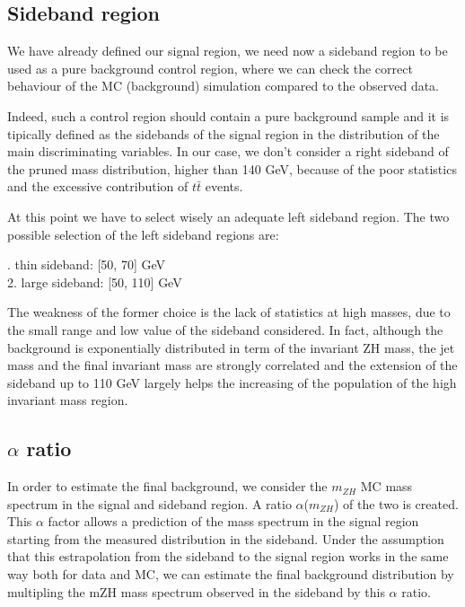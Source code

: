 \documentclass[12pt]{article} %
\begin{document}
\subsection{Sideband region} %

We have already defined our signal region, we need now a sideband region to be used as a pure background control region, where we can check the correct behaviour of the MC (background) simulation compared to the observed data. 

Indeed, such a control region should contain a pure background sample and it is tipically defined as the sidebands of the signal region in the distribution of the main discriminating variables. In our case, we don't consider a right sideband of the pruned mass distribution, higher than 140 GeV, because of the poor statistics and the excessive contribution of $t\bar{t}$ events.

At this point we have to select wisely an adequate left sideband region. The two possible selection of the left sideband regions are:

. thin sideband: [50, 70] GeV \\
2. large sideband: [50, 110] GeV 

The weakness of the former choice is the lack of statistics at high masses, due to the small range and low value of the sideband considered. In fact, although the background is exponentially distributed in term of the invariant ZH mass, the jet mass and the final invariant mass are strongly correlated and the extension of the sideband up to 110 GeV largely helps the increasing of the population of the high invariant mass region.


\subsection{$\alpha$ ratio} %

In order to estimate the final background, we consider the $m_{ZH}$ MC mass spectrum in the signal and sideband region. A ratio $\alpha$($m_{ZH}$) of the two is created. This $\alpha$ factor allows a prediction of the mass spectrum in the signal region starting from the measured distribution in the sideband. Under the assumption that this estrapolation from the sideband to the signal region works in the same way both for data and MC, we can estimate the final background distribution by multipling the mZH mass spectrum observed in the sideband by this $\alpha$ ratio.
\end{document}
